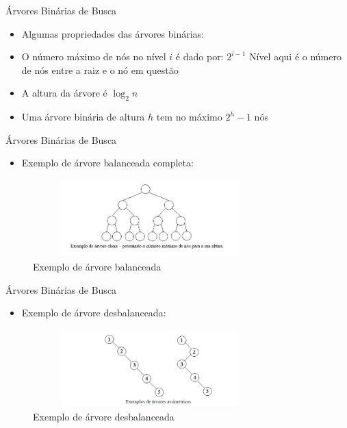 \begin{frame}
	\begin{block}{Árvores Binárias de Busca}
		\begin{itemize}
			\item Algumas propriedades das árvores binárias:

			\item O número máximo de nós no nível $i$ é dado por: $2^{i-1}$ Nível aqui é o número de nós entre a raiz e o nó em questão
			
			\item A altura da árvore é $\log_{2} n$
			
			\item Uma árvore binária de altura $h$ tem no máximo $2^{h} -1$ nós
		\end{itemize}
	\end{block}
\end{frame}

\begin{frame}
	\begin{block}{Árvores Binárias de Busca}
		\begin{itemize}
			\item Exemplo de árvore balanceada completa:
		\end{itemize}
		\begin{figure}[!htb]
			\centering	  				
			\includegraphics[height=3cm, width = 9cm]{./pic/arvoreCompleta.jpg}
			\caption{Exemplo de árvore balanceada}
			\label{fig_pilha}
		\end{figure}
	\end{block}
\end{frame}


\begin{frame}
	\begin{block}{Árvores Binárias de Busca}
		\begin{itemize}
			\item Exemplo de árvore desbalanceada:
		\end{itemize}
		\begin{figure}[!htb]
			\centering	  				
			\includegraphics[height=3cm, width = 9cm]{./pic/arvoresAssimetricas.jpg}
			\caption{Exemplo de árvore desbalanceada}
			\label{fig_pilha}
		\end{figure}
	\end{block}
\end{frame}


